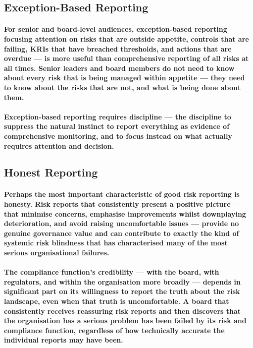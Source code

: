 \subsection{Exception-Based Reporting}
\paragraph{For senior and board-level audiences, \textbf{exception-based reporting} — focusing attention on risks that are outside appetite, controls that are failing, KRIs that have breached thresholds, and actions that are overdue — is more useful than comprehensive reporting of all risks at all times. Senior leaders and board members do not need to know about every risk that is being managed within appetite — they need to know about the risks that are not, and what is being done about them.}
\paragraph{Exception-based reporting requires discipline — the discipline to suppress the natural instinct to report everything as evidence of comprehensive monitoring, and to focus instead on what actually requires attention and decision.}

\subsection{Honest Reporting}
\paragraph{Perhaps the most important characteristic of good risk reporting is honesty. Risk reports that consistently present a positive picture — that minimise concerns, emphasise improvements whilst downplaying deterioration, and avoid raising uncomfortable issues — provide no genuine governance value and can contribute to exactly the kind of systemic risk blindness that has characterised many of the most serious organisational failures.}
\paragraph{The compliance function's credibility — with the board, with regulators, and within the organisation more broadly — depends in significant part on its willingness to report the truth about the risk landscape, even when that truth is uncomfortable. A board that consistently receives reassuring risk reports and then discovers that the organisation has a serious problem has been failed by its risk and compliance function, regardless of how technically accurate the individual reports may have been.}

